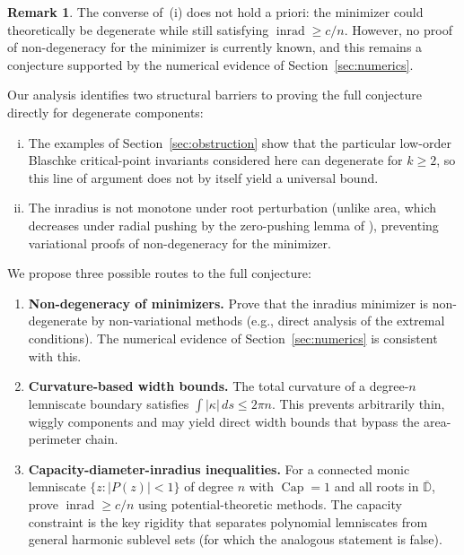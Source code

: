 \documentclass[11pt,a4paper]{amsart}
\theoremstyle{definition}
\newtheorem{remark}[theorem]{Remark}
\newcommand{\D}{\mathbb{D}}
\newcommand{\abs}[1]{\lvert #1 \rvert}
\newcommand{\inrad}{\operatorname{inrad}}
\renewcommand{\Cap}{\operatorname{Cap}}
\begin{document}
\begin{remark}
The converse of~(i) does not hold a priori: the minimizer could
theoretically be degenerate while still satisfying $\inrad \geq c/n$.
However, no proof of non-degeneracy for the minimizer is currently known,
and this remains a conjecture supported by the numerical evidence of
Section~\ref{sec:numerics}.
\end{remark}

Our analysis identifies two structural barriers to proving the
full conjecture directly for degenerate components:
\begin{enumerate}[(i)]
  \item The examples of Section~\ref{sec:obstruction} show that
    the particular low-order Blaschke critical-point invariants
    considered here can degenerate for
    $k \geq 2$, so this line of argument does not by itself yield
    a universal bound.
  \item The inradius is not monotone under root perturbation
    (unlike area, which decreases under radial pushing by the
    zero-pushing lemma of \cite{KLR25}), preventing variational
    proofs of non-degeneracy for the minimizer.
\end{enumerate}

We propose three possible routes to the full conjecture:
\begin{enumerate}
  \item \textbf{Non-degeneracy of minimizers.}
    Prove that the inradius minimizer is non-degenerate by
    non-variational methods (e.g., direct analysis of the
    extremal conditions).  The numerical evidence of
    Section~\ref{sec:numerics} is consistent with this.

  \item \textbf{Curvature-based width bounds.}
    The total curvature of a degree-$n$ lemniscate boundary
    satisfies $\int \abs{\kappa}\,ds \leq 2\pi n$.
    This prevents arbitrarily thin, wiggly components and may
    yield direct width bounds that bypass the area-perimeter chain.

  \item \textbf{Capacity-diameter-inradius inequalities.}
    For a connected monic lemniscate $\{z : \abs{P(z)} < 1\}$
    of degree $n$ with $\Cap = 1$ and all roots in $\overline{\D}$,
    prove $\inrad \geq c/n$ using potential-theoretic methods.
    The capacity constraint is the key rigidity that separates
    polynomial lemniscates from general harmonic sublevel sets
    (for which the analogous statement is false).
\end{enumerate}
\end{document}
